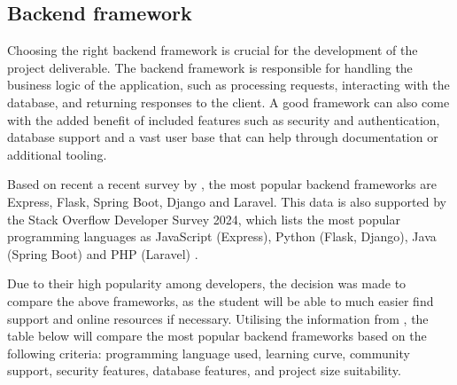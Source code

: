 \subsection{Backend framework}

Choosing the right backend framework is crucial for the development of the project deliverable. The backend framework is responsible for handling the business logic of the application, such as processing requests, interacting with the database, and returning responses to the client. A good framework can also come with the added benefit of included features such as security and authentication, database support and a vast user base that can help through documentation or additional tooling. 

Based on recent a recent survey by \textcite{statista-webframeworks}, the most popular backend frameworks are Express, Flask, Spring Boot, Django and Laravel. This data is also supported by the Stack Overflow Developer Survey 2024, which lists the most popular programming languages as JavaScript (Express), Python (Flask, Django), Java (Spring Boot) and PHP (Laravel) \parencite{stackoverflow}. 

Due to their high popularity among developers, the decision was made to compare the above frameworks, as the student will be able to much easier find support and online resources if necessary. Utilising the information from \textcite{spring,laravel,express,django}, the table below will compare the most popular backend frameworks based on the following criteria: programming language used, learning curve, community support, security features, database features, and project size suitability.

\begin{table}[h]
    \centering
    \caption{Comparison of backend frameworks}
    \label{tab:backend}
\end{table}

